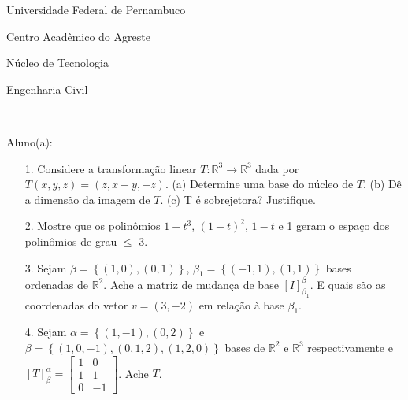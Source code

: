 \documentclass[oneside,a4paper,12pt]{article}
\newcommand{\universidade}{Universidade Federal de Pernambuco}
\newcommand{\centro}{Centro Acadêmico do Agreste}
\newcommand{\departamento}{Núcleo de Tecnologia}
\newcommand{\curso}{Engenharia Civil}
\begin{document}
	
  \vspace{60pt}
  
     \begin{center}
     	\vspace{0pt}
     	
     	\universidade
     	\par
     	\centro
     	\par
     	\departamento
     	\par
     	\curso
     	\par
     	\vspace{08pt}
     	\\
     \end{center}
     
     \begin{flushleft}
     	Aluno(a):
     \end{flushleft}
 
\begin{itemize}
	\item[1.]Considere a transformação linear $T:\mathbb{R}^{3}\longrightarrow \mathbb{R}^{3}$ dada por $T(x,y,z)=(z,x-y,-z)$. (a) Determine uma base do núcleo de $T$. (b) Dê a dimensão da imagem de $T$. (c) T é sobrejetora? Justifique.
\end{itemize}
\begin{itemize}
	\item[2.] Mostre que os polinômios $1-t^{3}$, $(1-t)^{2}$, $1-t$ e 1 geram o espaço dos polinômios de grau $\leqslant$ 3. 
\end{itemize}
\begin{itemize}
	\item [3.] Sejam $\beta=\left\lbrace (1,0),(0,1) \right\rbrace $, $\beta_{1}=\left\lbrace (-1,1), (1,1)\right\rbrace $ bases ordenadas de $\mathbb{R}^{2}$. Ache a matriz de mudança de base $[I]_{\beta_{1}}^{\beta}$. E quais são as coordenadas do vetor $v=(3,-2)$ em relação à base $\beta_{1}$.
\end{itemize}
\begin{itemize}
	\item[4.] Sejam $\alpha=\left\lbrace (1,-1),(0,2)\right\rbrace $ e $\beta=\left\lbrace (1,0,-1),(0,1,2),(1,2,0)\right\rbrace $ bases de $\mathbb{R}^{2}$ e $\mathbb{R}^{3}$ respectivamente e
	$[T]_{\beta}^{\alpha}=\left[\begin{array}{rr}
	1&0\\
	1&1\\
	0&-1
	\end{array}\right]$. Ache $T$.
\end{itemize}
\end{document}
